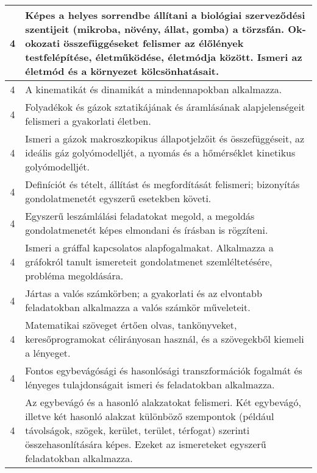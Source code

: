 \begin{longtable}{c | p{12cm} }
                                
                                          4 &  Képes a helyes sorrendbe állítani a biológiai szerveződési szentijeit (mikroba, növény, állat, gomba) a törzsfán. Ok-okozati összefüggéseket felismer az élőlények testfelépítése, életműködése, életmódja között. Ismeri az életmód és a környezet kölcsönhatásait. \\ \hline
                                          4 &  A kinematikát és dinamikát a mindennapokban alkalmazza. \\ \hline
                                          4 &  Folyadékok és gázok sztatikájának és áramlásának alapjelenségeit felismeri a gyakorlati életben. \\ \hline
                                          4 &  Ismeri a gázok makroszkopikus állapotjelzőit és összefüggéseit, az ideális gáz golyómodelljét, a nyomás és a hőmérséklet kinetikus golyómodelljét. \\ \hline
                                          4 &  Definíciót és tételt, állítást és megfordítását felismeri; bizonyítás gondolatmenetét egyszerű esetekben követi. \\ \hline
                                          4 &  Egyszerű leszámlálási feladatokat megold, a megoldás gondolatmenetét képes elmondani és írásban is rögzíteni. \\ \hline
                                          4 &  Ismeri a gráffal kapcsolatos alapfogalmakat. Alkalmazza a gráfokról tanult ismereteit gondolatmenet szemléltetésére, probléma megoldására. \\ \hline
                                          4 &  Jártas a valós számkörben; a gyakorlati és az elvontabb feladatokban alkalmazza a valós számkör műveleteit. \\ \hline
                                          4 &  Matematikai szöveget értően olvas, tankönyveket, keresőprogramokat célirányosan használ, és a szövegekből kiemeli a lényeget. \\ \hline
                                          4 &  Fontos egybevágósági és hasonlósági transzformációk fogalmát  és lényeges tulajdonságait ismeri és feladatokban alkalmazza. \\ \hline
                                          4 &  Az egybevágó és a hasonló alakzatokat felismeri. Két egybevágó, illetve két hasonló alakzat különböző szempontok (például távolságok, szögek, kerület, terület, térfogat) szerinti összehasonlítására képes. Ezeket az ismereteket egyszerű feladatokban alkalmazza. \\ \hline

\end{longtable}

